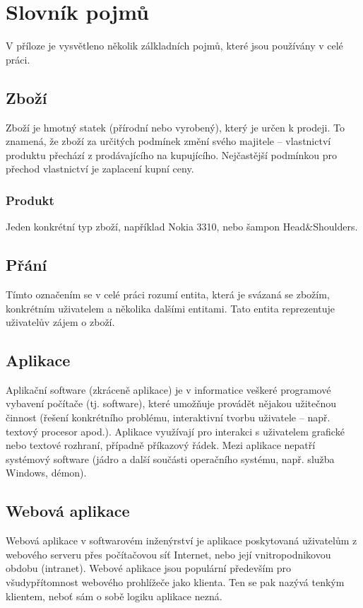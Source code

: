 \chapter{Slovník pojmů}
V příloze je vysvětleno několik zálkladních pojmů, které jsou používány v celé práci.
\section{Zboží}
Zboží je hmotný statek (přírodní nebo vyrobený), který je určen k prodeji. To znamená, že zboží za určitých podmínek změní svého majitele – vlastnictví produktu přechází z prodávajícího na kupujícího. Nejčastější podmínkou pro přechod vlastnictví je zaplacení kupní ceny.
\subsection{Produkt}
Jeden konkrétní typ zboží, například Nokia 3310, nebo šampon Head\&Shoulders.
\section{Přání}
Tímto označením se v celé práci rozumí entita, která je svázaná se zbožím, konkrétním uživatelem a několika dalšími entitami. Tato entita reprezentuje uživatelův zájem o zboží.

\section{Aplikace}
Aplikační software (zkráceně aplikace) je v informatice veškeré programové vybavení počítače (tj. software), které umožňuje provádět nějakou užitečnou činnost (řešení konkrétního problému, interaktivní tvorbu uživatele – např. textový procesor apod.). Aplikace využívají pro interakci s uživatelem grafické nebo textové rozhraní, případně příkazový řádek. Mezi aplikace nepatří systémový software (jádro a další součásti operačního systému, např. služba Windows, démon).

\section{Webová aplikace}
Webová aplikace v softwarovém inženýrství je aplikace poskytovaná uživatelům z webového serveru přes počítačovou síť Internet, nebo její vnitropodnikovou obdobu (intranet). Webové aplikace jsou populární především pro všudypřítomnost webového prohlížeče jako klienta. Ten se pak nazývá tenkým klientem, neboť sám o sobě logiku aplikace nezná.

